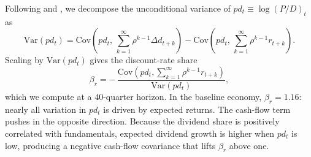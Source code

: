 \documentclass[12pt,english]{article}
\newcommand{\var}{\mathrm{Var}}
\newcommand{\cov}{\mathrm{Cov}}
\begin{document}
Following \citet{campbell1988dividend} and \citet{cochrane2011presidential}, we decompose the unconditional variance of $pd_t \equiv \log(P/D)_t$ as
\begin{equation}\label{eq:cs_decomp}
    \var(pd_t) = \cov\!\left(pd_t,\, \sum_{k=1}^{\infty}\rho^{k-1}\Delta d_{t+k}\right) - \cov\!\left(pd_t,\, \sum_{k=1}^{\infty}\rho^{k-1} r_{t+k}\right).
\end{equation}
Scaling by $\var(pd_t)$ gives the discount-rate share
\[
    \beta_r = -\,\frac{\cov\!\left(pd_t,\sum_{k=1}^{\infty}\rho^{k-1} r_{t+k}\right)}{\var(pd_t)},
\]
which we compute at a $40$-quarter horizon.
In the baseline economy, $\beta_r = 1.16$: nearly all variation in $pd_t$ is driven by expected returns.
The cash-flow term pushes in the opposite direction.
Because the dividend share is positively correlated with fundamentals, expected dividend growth is higher when $pd_t$ is low, producing a negative cash-flow covariance that lifts $\beta_r$ above one.
\end{document}
